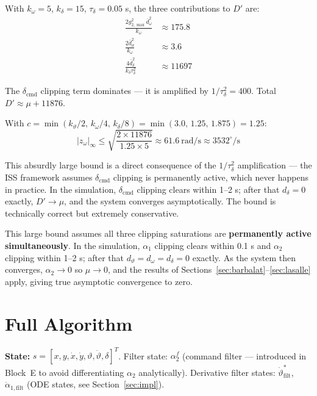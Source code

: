 \documentclass[11pt,a4paper]{article}
\theoremstyle{plain}
\theoremstyle{remark}
\newcommand{\vth}{\vartheta}
\newcommand{\vths}{\vartheta^*}
\newcommand{\zom}{z_{\omega}}
\newcommand{\dcmd}{\delta_{\mathrm{cmd}}}
\begin{document}
With $k_\omega = 5$, $k_\delta = 15$, $\tau_\delta = 0.05$ s, the three contributions to $D'$ are:
\begin{align}
  \frac{2g_{2,\max}^2\bar{d}_\omega^2}{k_\omega} &\approx 175.8 \\
  \frac{2\bar{d}_\vartheta^2}{k_\omega} &\approx 3.6 \\
  \frac{4\bar{d}_\delta^2}{k_\delta\tau_\delta^2} &\approx 11697
\end{align}

The $\dcmd$ clipping term dominates --- it is amplified by $1/\tau_\delta^2 = 400$. Total $D' \approx \mu + 11876$.

With $c = \min(k_\vth/2,\, k_\omega/4,\, k_\delta/8) = \min(3.0,\, 1.25,\, 1.875) = 1.25$:
\[
  |\zom|_\infty \leq \sqrt{\frac{2 \times 11876}{1.25 \times 5}} \approx 61.6\ \text{rad/s} \approx 3532^{\circ}/\text{s}
\]

This absurdly large bound is a direct consequence of the $1/\tau_\delta^2$ amplification --- the ISS framework assumes $\dcmd$ clipping is permanently active, which never happens in practice. In the simulation, $\dcmd$ clipping clears within 1--2 s; after that $d_\delta = 0$ exactly, $D' \to \mu$, and the system converges asymptotically. The bound is technically correct but extremely conservative.

This large bound assumes all three clipping saturations are \textbf{permanently active simultaneously}. In the simulation, $\alpha_1$ clipping clears within 0.1 s and $\alpha_2$ clipping within 1--2 s; after that $d_\vartheta = d_\omega = d_\delta = 0$ exactly. As the system then converges, $\alpha_2 \to 0$ so $\mu \to 0$, and the results of Sections~\ref{sec:barbalat}--\ref{sec:lasalle} apply, giving true asymptotic convergence to zero.

\section{Full Algorithm}

\textbf{State:} $s = [x, y, \dot x, \dot y, \vth, \dot\vth, \delta]^T$. Filter state: $\alpha_2^f$ (command filter --- introduced in Block~E to avoid differentiating $\alpha_2$ analytically). Derivative filter states: $\dot\vths_{\mathrm{filt}}$, $\dot\alpha_{1,\mathrm{filt}}$ (ODE states, see Section~\ref{sec:impl}).
\end{document}
